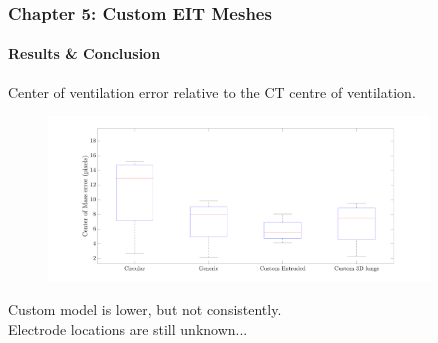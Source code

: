 \documentclass[10pt,    %
    english,            %
    xcolor=table,       %
    envcountsect,        %
    aspectratio=1610
]{beamer}
\begin{document}
\begin{frame}
	\frametitle{Chapter 5: Custom EIT Meshes}
	\framesubtitle{Results \& Conclusion}   
	Center of ventilation error relative to the CT centre of ventilation.
	\\ \vspace{2mm}
	\begin{figure}[H]
		\centering
		\includegraphics[width=0.9\textwidth,trim={0 1.5cm 0 1.5cm},clip]{error_boxplot.pdf}
	\end{figure}%
	\vspace{1mm}
	Custom model is lower, but not consistently. 
	\\ \vspace{5mm}
	\centering
	\alert{Electrode locations are still unknown...}
\end{frame}
\end{document}
